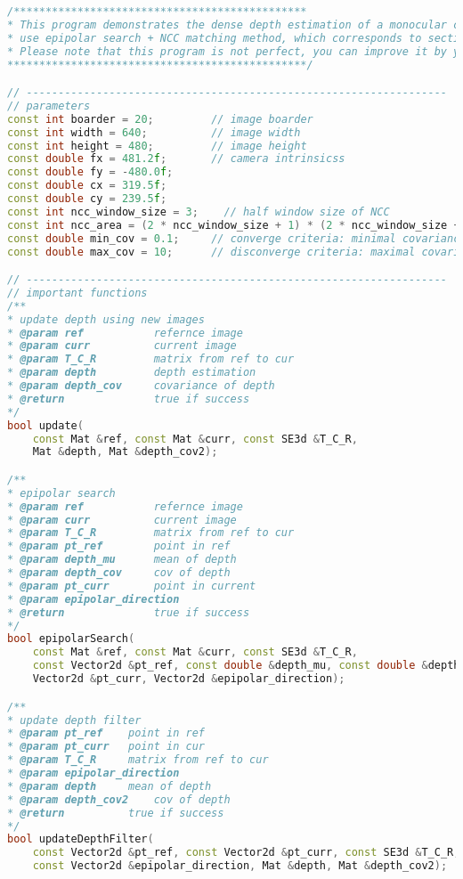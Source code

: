 \begin{lstlisting}[language=c++,caption=slambook2/ch12/dense\_monocular/dense\_mapping.cpp (part)]
/**********************************************
* This program demonstrates the dense depth estimation of a monocular camera under a known trajectory
* use epipolar search + NCC matching method, which corresponds to section 12.2 of the book
* Please note that this program is not perfect, you can improve it by yourself.
***********************************************/

// ------------------------------------------------------------------
// parameters
const int boarder = 20;         // image boarder
const int width = 640;          // image width
const int height = 480;         // image height
const double fx = 481.2f;       // camera intrinsicss
const double fy = -480.0f;
const double cx = 319.5f;
const double cy = 239.5f;
const int ncc_window_size = 3;    // half window size of NCC 
const int ncc_area = (2 * ncc_window_size + 1) * (2 * ncc_window_size + 1); // area of NCC
const double min_cov = 0.1;     // converge criteria: minimal covariance
const double max_cov = 10;      // disconverge criteria: maximal covariance 

// ------------------------------------------------------------------
// important functions
/**
* update depth using new images
* @param ref           refernce image 
* @param curr          current image 
* @param T_C_R         matrix from ref to cur
* @param depth         depth estimation 
* @param depth_cov     covariance of depth 
* @return              true if success
*/
bool update(
	const Mat &ref, const Mat &curr, const SE3d &T_C_R,
	Mat &depth, Mat &depth_cov2);

/**
* epipolar search
* @param ref           refernce image 
* @param curr          current image 
* @param T_C_R         matrix from ref to cur 
* @param pt_ref        point in ref
* @param depth_mu      mean of depth 
* @param depth_cov     cov of depth 
* @param pt_curr       point in current
* @param epipolar_direction  
* @return              true if success
*/
bool epipolarSearch(
	const Mat &ref, const Mat &curr, const SE3d &T_C_R,
	const Vector2d &pt_ref, const double &depth_mu, const double &depth_cov,
	Vector2d &pt_curr, Vector2d &epipolar_direction);

/**
* update depth filter
* @param pt_ref    point in ref
* @param pt_curr   point in cur 
* @param T_C_R     matrix from ref to cur 
* @param epipolar_direction 
* @param depth     mean of depth 
* @param depth_cov2    cov of depth 
* @return          true if success
*/
bool updateDepthFilter(
	const Vector2d &pt_ref, const Vector2d &pt_curr, const SE3d &T_C_R,
	const Vector2d &epipolar_direction, Mat &depth, Mat &depth_cov2);


\end{lstlisting}
